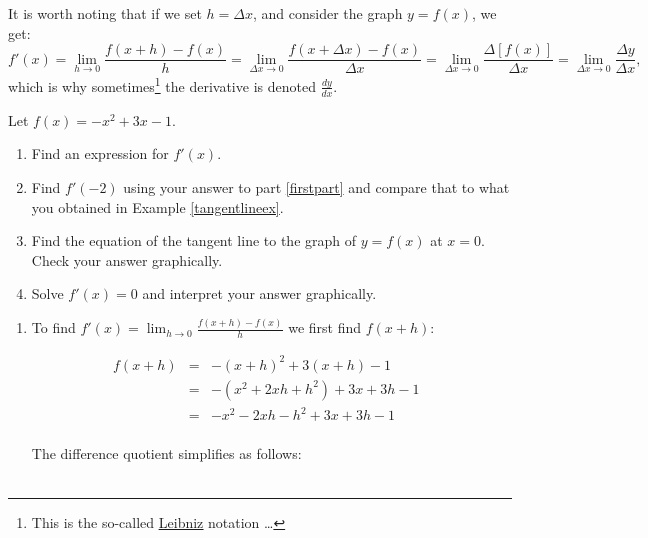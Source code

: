 \documentclass{ximera}
\begin{document}


It is worth noting that if we set $h = \Delta x$, and consider the graph $y = f(x)$, we get:  \[ f'(x) = \lim_{h \rightarrow 0}  \frac{f(x+h) - f(x)}{h} = \lim_{\Delta x \rightarrow 0}  \frac{f(x+\Delta x) - f(x)}{\Delta x}  = \lim_{\Delta x \rightarrow 0}  \frac{\Delta [f(x)] }{\Delta x} =  \lim_{\Delta x \rightarrow 0}  \frac{\Delta y }{\Delta x} ,\] which is why sometimes\footnote{This is the so-called  \href{https://en.wikipedia.org/wiki/Gottfried_Wilhelm_Leibniz}{\underline{Leibniz}} notation \ldots}  the derivative is denoted $\frac{dy}{dx}$.



\begin{example}  \label{derivativeex}  Let $f(x) = -x^2 + 3x-1$.  

\begin{enumerate}

\item \label{firstpart} Find an expression for $f'(x)$.  

\item  Find $f'(-2)$ using your answer to part \ref{firstpart}   and compare that to what you obtained in Example \ref{tangentlineex}.

\item  Find the equation of the tangent line to the graph of $y = f(x)$ at $x = 0$.  Check your answer graphically.

\item  Solve $f'(x) = 0 $ and interpret your answer graphically.

\end{enumerate}

\begin{explanation}
\begin{enumerate}

\item  To find  $f'(x) = \lim_{h \rightarrow 0}  \frac{f(x+h) - f(x)}{h}$ we  first find $f(x+h)$:

\[ \begin{array}{rclr}  
  f(x+h) & = & -(x+h)^2 +3(x+h) -1 & \\ 
  & = & - (x^2 +2xh+h^2) +3x+3h-1 & \\
 & = & -x^2 -  2xh - h^2+3x+3h-1& \\
 \end{array} \]

The difference quotient simplifies as follows:

\[ \begin{array}{rclr}


\end{array}\]
\end{enumerate}
\end{explanation}
\end{example}
\end{document}

